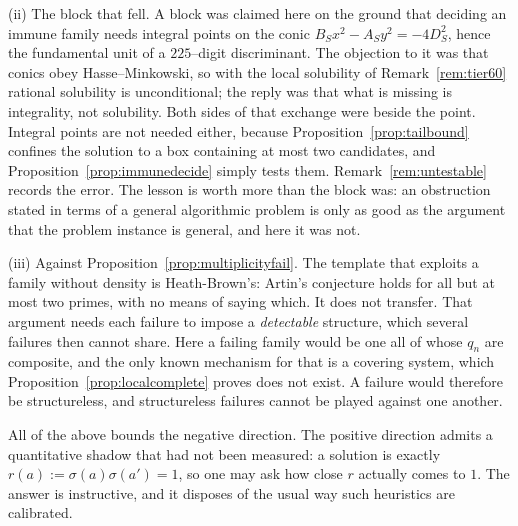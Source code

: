 \documentclass[11pt]{article}
\theoremstyle{definition}
\begin{document}
\textup{(ii) The block that fell.} A block was claimed here on the ground that deciding an immune
family needs integral points on the conic $B_Sx^2-A_Sy^2=-4D_S^2$, hence the fundamental unit of a
$225$--digit discriminant. The objection to it was that conics obey Hasse--Minkowski, so with the
local solubility of Remark~\ref{rem:tier60} rational solubility is unconditional; the reply was that
what is missing is integrality, not solubility. Both sides of that exchange were beside the point.
Integral points are not needed either, because Proposition~\ref{prop:tailbound} confines the solution
to a box containing at most two candidates, and Proposition~\ref{prop:immunedecide} simply tests
them. Remark~\ref{rem:untestable} records the error. The lesson is worth more than the block was: an
obstruction stated in terms of a general algorithmic problem is only as good as the argument that the
problem instance is general, and here it was not.

\textup{(iii) Against Proposition~\ref{prop:multiplicityfail}.} The template that exploits a family
without density is Heath-Brown's: Artin's conjecture holds for all but at most two primes, with no
means of saying which. It does not transfer. That argument needs each failure to impose a
\emph{detectable} structure, which several failures then cannot share. Here a failing family would
be one all of whose $q_n$ are composite, and the only known mechanism for that is a covering system,
which Proposition~\ref{prop:localcomplete} proves does not exist. A failure would therefore be
structureless, and structureless failures cannot be played against one another.


All of the above bounds the negative direction. The positive direction admits a quantitative
shadow that had not been measured: a solution is exactly $r(a):=\sigma(a)\sigma(a')=1$, so one may
ask how close $r$ actually comes to $1$. The answer is instructive, and it disposes of the usual
way such heuristics are calibrated.
\end{document}
